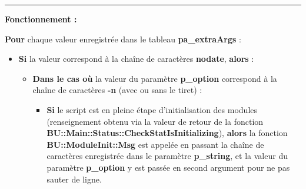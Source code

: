 \documentclass[a4paper,10pt]{article}
\begin{document}
\setlength{\parskip}{2em}


\par\noindent\rule{\textwidth}{0.4pt}

\setlength{\parskip}{1em}

\begin{justify}
    \textbf{Fonctionnement :}

    \textbf{\color{loop}Pour} chaque valeur enregistrée dans le tableau \textbf{\color{vars}pa\_extraArgs} :
\end{justify}

\begin{itemize}
    \item
    {
        \begin{justify}
            \textbf{\color{cond}Si} la valeur correspond à la chaîne de caractères \textbf{nodate}, \textbf{\color{cond}alors} :
        \end{justify}

        \setlength{\parskip}{1em}
            
        \begin{itemize}
            \item
            {
                \begin{justify}
                    \textbf{\color{case}Dans le cas où} la valeur du paramètre \textbf{\color{vars}p\_option} correspond à la chaîne de caractères \textbf{-n} (avec ou sans le tiret) :
                \end{justify}

                \setlength{\parskip}{1em}

                \begin{itemize}
                    \item
                    {
                        \begin{justify}
                            \textbf{\color{cond}Si} le script est en pleine étape d'initialisation des modules (renseignement obtenu via la valeur de retour de la fonction \textbf{\color{func}BU::Main::Status::CheckStatIsInitializing}), \textbf{\color{cond}alors} la fonction \textbf{\color{func}BU::ModuleInit::Msg} est appelée en passant la chaîne de caractères enregistrée dans le paramètre \textbf{\color{vars}p\_string}, et la valeur du paramètre \textbf{\color{vars}p\_option} y est passée en second argument pour ne pas sauter de ligne. 
                        \end{justify}

}
\end{itemize}}
\end{itemize}}
\end{itemize}
\end{document}
